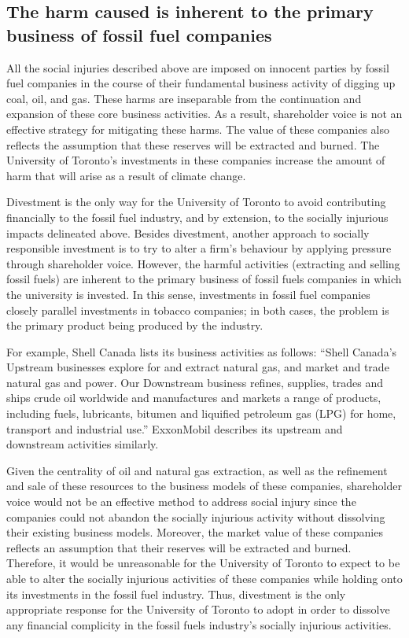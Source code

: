 	\subsection{The harm caused is inherent to the primary business of fossil fuel companies}



All the social injuries described above are imposed on innocent parties by fossil fuel companies in the course of their fundamental business activity of digging up coal, oil, and gas.
These harms are inseparable from the continuation and expansion of these core business activities.
As a result, shareholder voice is not an effective strategy for mitigating these harms. 
The value of these companies also reflects the assumption that these reserves will be extracted and burned.
The University of Toronto's investments in these companies increase the amount of harm that will arise as a result of climate change.



Divestment is the only way for the University of Toronto to avoid contributing financially to the fossil fuel industry, and by extension, to the socially injurious impacts delineated above.
Besides divestment, another approach to socially responsible investment is to try to alter a firm’s behaviour by applying pressure through shareholder voice. 
However, the harmful activities (extracting and selling fossil fuels) are inherent to the primary business of fossil fuels companies in which the university is invested.  
In this sense, investments in fossil fuel companies closely parallel investments in tobacco companies; in both cases, the problem is the primary product being produced by the industry.



For example, Shell Canada lists its business activities as follows: ``Shell Canada's Upstream businesses explore for and extract natural gas, and market and trade natural gas and power. Our Downstream business refines, supplies, trades and ships crude oil worldwide and manufactures and markets a range of products, including fuels, lubricants, bitumen and liquified petroleum gas (LPG) for home, transport and industrial use.'' ExxonMobil describes its upstream and downstream activities similarly.   



Given the centrality of oil and natural gas extraction, as well as the refinement and sale of these resources to the business models of these companies, shareholder voice would not be an effective method to address social injury since the companies could not abandon the socially injurious activity without dissolving their existing business models.  
Moreover, the market value of these companies reflects an assumption that their reserves will be extracted and burned.  
Therefore, it would be unreasonable for the University of Toronto to expect to be able to alter the socially injurious activities of these companies while holding onto its investments in the fossil fuel industry.  
Thus, divestment is the only appropriate response for the University of Toronto to adopt in order to dissolve any financial complicity in the fossil fuels industry’s socially injurious activities.  



